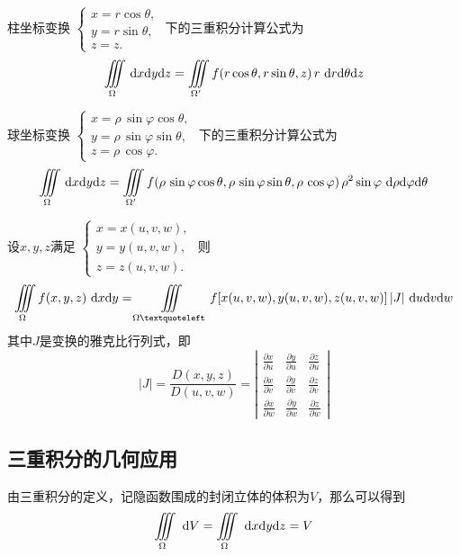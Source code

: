 \theorem[柱坐标变换]
柱坐标变换
$
\begin{cases}
	x =r \cos \theta,\\
	y = r \sin \theta ,\\
	z = z.
\end{cases}
$
下的三重积分计算公式为
\begin{equation}
	\iiint\limits_{\Omega} \,{\rm{d}} x {\rm{d}} y  {\rm{d}} z = \iiint\limits_{\Omega'} f(r\cos\theta,r\sin\theta,z)\,r \,\,{\rm{d}} r {\rm{d}} \theta  {\rm{d}} z
\end{equation}

\ttheorem[球坐标变换]
球坐标变换
$
\begin{cases}
	x =\rho \,\sin \varphi \cos \theta,\\
	y = \rho \,\sin \varphi \sin \theta ,\\
	z = \rho \,\cos \varphi .
\end{cases}
$
下的三重积分计算公式为
\begin{equation}
	\iiint\limits_{\Omega} \,{\rm{d}} x {\rm{d}} y  {\rm{d}} z = \iiint\limits_{\Omega'} f(\rho \,\sin \varphi \cos \theta,\rho \,\sin \varphi \sin \theta , \rho \,\cos \varphi)\, \rho^2 \sin \varphi \,\,{\rm{d}} \rho {\rm{d}} \varphi  {\rm{d}} \theta 
\end{equation}

\ttheorem[一般变换]
设$x,y,z$满足
$
\begin{cases}
	x = x(u,v,w),\\
	y = y(u,v,w), \\
	z = z(u,v,w).
\end{cases}
$
则
\begin{equation}
	\iiint\limits_{\Omega }f(x,y,z)\,\, \d x \d y= \iiint\limits_{\Omega‘}f[x(u,v,w),y(u,v,w),z(u,v,w)]\,|J|\, \,\d u \d v \d w
\end{equation}
其中$J$是变换的雅克比行列式，即
\renewcommand{\arraystretch}{1.5}
\begin{equation*}
	|J|=\frac{D(x,y,z)}{D(u,v,w)}=
	\left| 
	\begin{array}{ccc}
		\displaystyle \frac{\partial x}{\partial u} & \displaystyle \frac{\partial y}{\partial u} & \displaystyle \frac{\partial z}{\partial u} \\
		\displaystyle \frac{\partial x}{\partial v} & \displaystyle \frac{\partial y}{\partial v} & \displaystyle \frac{\partial z}{\partial v} \\
		\displaystyle \frac{\partial x}{\partial w} & \displaystyle \frac{\partial y}{\partial w} & \displaystyle \frac{\partial z}{\partial w} 
	\end{array}
	\right| 
\end{equation*}
\renewcommand{\arraystretch}{1}


\subsection{三重积分的几何应用}
\sj
\example[求立体的体积]
由三重积分的定义，记隐函数围成的封闭立体的体积为$V$，那么可以得到
\begin{equation}
	\iiint\limits_{\Omega} \, \, {\rm{d}} V=\iiint\limits_{\Omega}\, \, {\rm{d}} x {\rm{d}} y {\rm{d}} z=V
\end{equation}